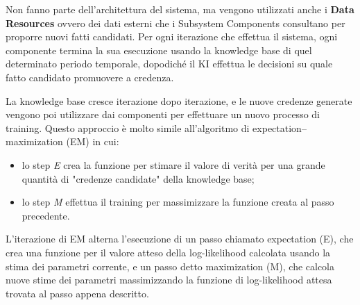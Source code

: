 \noindent Non fanno parte dell'architettura del sistema, ma vengono utilizzati anche i \textbf{Data Resources} ovvero dei dati esterni che i Subsystem Components consultano per proporre nuovi fatti candidati. Per ogni iterazione che effettua il sistema, ogni componente termina la sua esecuzione usando la knowledge base di quel determinato periodo temporale, dopodiché il KI effettua le decisioni su quale fatto candidato promuovere a credenza.


\noindent La knowledge base cresce iterazione dopo iterazione, e le nuove credenze generate vengono poi utilizzare dai componenti per effettuare un nuovo processo di training. Questo approccio è molto simile all'algoritmo di expectation–maximization (EM) in cui:
\begin{itemize}
    \item lo step \textit{E} crea la funzione per stimare il valore di verità per una grande quantità di "credenze candidate" della knowledge base;
    \item lo step \textit{M} effettua il training per massimizzare la funzione creata al passo precedente\cite{TowardAnArchitecture:online}.
\end{itemize}

\begin{info}[Algoritmo EM]
L'iterazione di EM alterna l'esecuzione di un passo chiamato expectation (E), che crea una funzione per il valore atteso della log-likelihood calcolata usando la stima dei parametri corrente, e un passo detto maximization (M), che calcola nuove stime dei parametri massimizzando la funzione di log-likelihood attesa trovata al passo appena descritto\cite{AlgoritmEM:online}.
\end{info}

